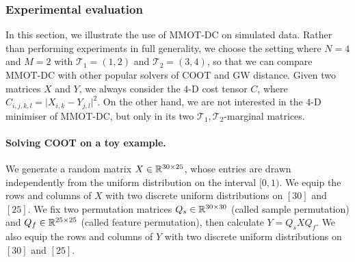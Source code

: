 \subsubsection{Experimental evaluation} \label{sec:exp}
In this section, we illustrate the use of MMOT-DC on simulated data. Rather than performing experiments in full generality,
we choose the setting where $N = 4$ and $M=2$ with $\mathcal T_1 = (1,2)$ and $\mathcal T_2 = (3,4)$,
so that we can compare MMOT-DC with other popular solvers of COOT and GW distance. Given two matrices $X$ and $Y$, we always consider the $4$-D cost tensor $C$,
where $C_{i,j,k,l} = \vert X_{i,k} - Y_{j,l} \vert^2$. On the other hand, we are not interested in the $4$-D minimiser of MMOT-DC,
but only in its two $\mathcal T_1, \mathcal T_2$-marginal matrices.

\paragraph{Solving COOT on a toy example.} We generate a random matrix $X \in \mathbb R^{30 \times 25}$, whose entries are drawn independently
from the uniform distribution on the interval $[0,1)$. We equip the rows and columns of $X$ with two discrete uniform distributions
on $[30]$ and $[25]$. We fix two permutation matrices $Q_s \in \mathbb R^{30 \times 30}$ (called sample permutation) and
$Q_f \in \mathbb R^{25 \times 25}$ (called feature permutation), then calculate $Y = Q_s X Q_f$. We also equip the rows and columns of $Y$
with two discrete uniform distributions on $[30]$ and $[25]$.

